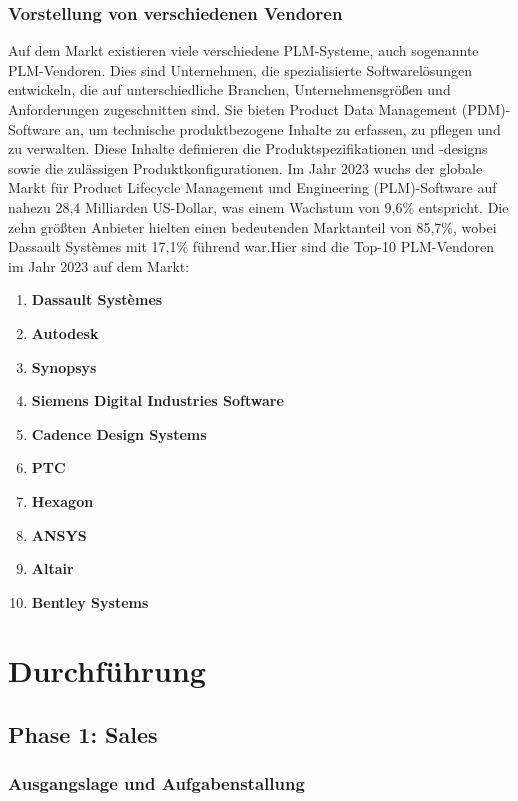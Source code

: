 \documentclass[a4paper, 12pt]{scrartcl}
\begin{document}
	\subsubsection{Vorstellung von verschiedenen Vendoren}
	Auf dem Markt existieren viele verschiedene PLM-Systeme, auch sogenannte PLM-Vendoren. Dies sind Unternehmen, die spezialisierte Softwarelösungen entwickeln, die auf unterschiedliche Branchen, Unternehmensgrößen und Anforderungen zugeschnitten sind. Sie bieten Product Data Management (PDM)-Software an, um technische produktbezogene Inhalte zu erfassen, zu pflegen und zu verwalten. Diese Inhalte definieren die Produktspezifikationen und -designs sowie die zulässigen Produktkonfigurationen\cite{PLM}.
	Im Jahr 2023 wuchs der globale Markt für Product Lifecycle Management und Engineering (PLM)-Software auf nahezu 28,4 Milliarden US-Dollar, was einem Wachstum von 9,6\% entspricht. Die zehn größten Anbieter hielten einen bedeutenden Marktanteil von 85,7\%, wobei Dassault Systèmes mit 17,1\% führend war.Hier sind die Top-10 PLM-Vendoren im Jahr 2023 auf dem Markt\cite{Top10PLMVendoren}:
	\begin{enumerate}
		\item \textbf{Dassault Systèmes} 
		\item \textbf{Autodesk}
		\item \textbf{Synopsys}
		\item \textbf{Siemens Digital Industries Software}
		\item \textbf{Cadence Design Systems}
		\item \textbf{PTC}
		\item \textbf{Hexagon}
		\item \textbf{ANSYS}
		\item \textbf{Altair}
		\item \textbf{Bentley Systems}
	\end{enumerate}
	
	\section{Durchführung}
	\subsection{Phase 1: Sales} 
	\subsubsection{Ausgangslage und Aufgabenstallung} %
\end{document}
